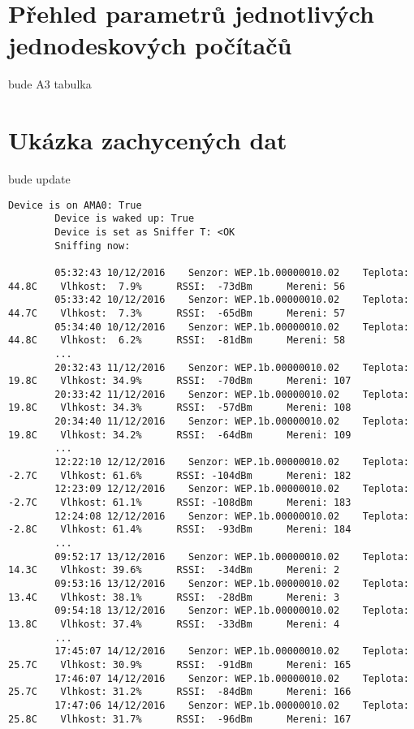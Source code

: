\chapter{Přehled parametrů jednotlivých jednodeskových počítačů}
\label{PrilohaTabulka}
	\colorbox[rgb]{1,0,0}{bude A3 tabulka}

\chapter{Ukázka zachycených dat}
\label{PrilohaVystup}
	\colorbox[rgb]{1,0,0}{bude update}
	\begin{lstlisting}[style=MyCodeBash]
		Device is on AMA0: True
		Device is waked up: True
		Device is set as Sniffer T: <OK
		Sniffing now:

		05:32:43 10/12/2016    Senzor: WEP.1b.00000010.02    Teplota: 44.8C    Vlhkost:  7.9%      RSSI:  -73dBm      Mereni: 56
		05:33:42 10/12/2016    Senzor: WEP.1b.00000010.02    Teplota: 44.7C    Vlhkost:  7.3%      RSSI:  -65dBm      Mereni: 57
		05:34:40 10/12/2016    Senzor: WEP.1b.00000010.02    Teplota: 44.8C    Vlhkost:  6.2%      RSSI:  -81dBm      Mereni: 58
		...
		20:32:43 11/12/2016    Senzor: WEP.1b.00000010.02    Teplota: 19.8C    Vlhkost: 34.9%      RSSI:  -70dBm      Mereni: 107
		20:33:42 11/12/2016    Senzor: WEP.1b.00000010.02    Teplota: 19.8C    Vlhkost: 34.3%      RSSI:  -57dBm      Mereni: 108
		20:34:40 11/12/2016    Senzor: WEP.1b.00000010.02    Teplota: 19.8C    Vlhkost: 34.2%      RSSI:  -64dBm      Mereni: 109
		...
		12:22:10 12/12/2016    Senzor: WEP.1b.00000010.02    Teplota: -2.7C    Vlhkost: 61.6%      RSSI: -104dBm      Mereni: 182
		12:23:09 12/12/2016    Senzor: WEP.1b.00000010.02    Teplota: -2.7C    Vlhkost: 61.1%      RSSI: -108dBm      Mereni: 183 
		12:24:08 12/12/2016    Senzor: WEP.1b.00000010.02    Teplota: -2.8C    Vlhkost: 61.4%      RSSI:  -93dBm      Mereni: 184
		...
		09:52:17 13/12/2016    Senzor: WEP.1b.00000010.02    Teplota: 14.3C    Vlhkost: 39.6%      RSSI:  -34dBm      Mereni: 2
		09:53:16 13/12/2016    Senzor: WEP.1b.00000010.02    Teplota: 13.4C    Vlhkost: 38.1%      RSSI:  -28dBm      Mereni: 3 
		09:54:18 13/12/2016    Senzor: WEP.1b.00000010.02    Teplota: 13.8C    Vlhkost: 37.4%      RSSI:  -33dBm      Mereni: 4
		...
		17:45:07 14/12/2016    Senzor: WEP.1b.00000010.02    Teplota: 25.7C    Vlhkost: 30.9%      RSSI:  -91dBm      Mereni: 165
		17:46:07 14/12/2016    Senzor: WEP.1b.00000010.02    Teplota: 25.7C    Vlhkost: 31.2%      RSSI:  -84dBm      Mereni: 166
		17:47:06 14/12/2016    Senzor: WEP.1b.00000010.02    Teplota: 25.8C    Vlhkost: 31.7%      RSSI:  -96dBm      Mereni: 167

	\end{lstlisting}
	

